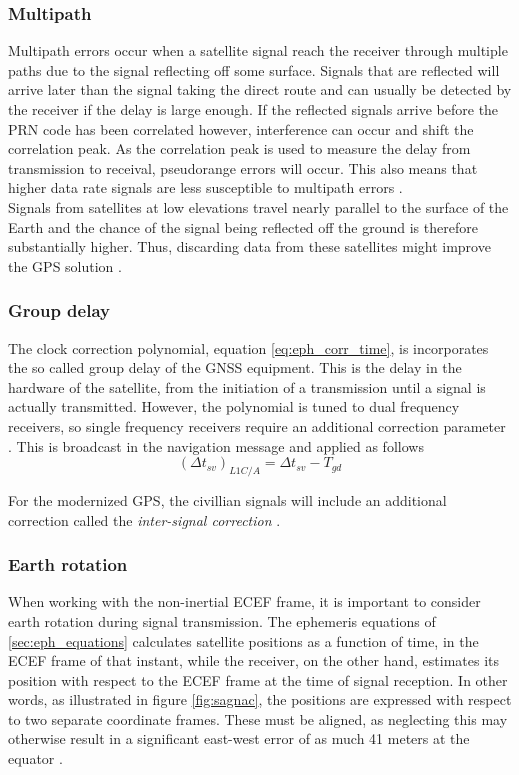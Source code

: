 \subsubsection{Multipath}
\label{sec:multipath}
Multipath errors occur when a satellite signal reach the receiver through multiple paths due to the signal reflecting off some surface. Signals that are reflected will arrive later than the signal taking the direct route and can usually be detected by the receiver if the delay is large enough. If the reflected signals arrive before the PRN code has been correlated however, interference can occur and shift the correlation peak. As the correlation peak is used to measure the delay from transmission to receival, pseudorange errors will occur. This also means that higher data rate signals are less susceptible to multipath errors \cite{groves2013principles}. \\

Signals from satellites at low elevations travel nearly parallel to the surface of the Earth and the chance of the signal being reflected off the ground is therefore substantially higher. Thus, discarding data from these satellites might improve the GPS solution \cite{farrell2008aided, groves2013principles}.

\subsubsection{Group delay}
The clock correction polynomial, equation \ref{eq:eph_corr_time}, is incorporates the so called group delay of the GNSS equipment. This is the delay in the hardware of the satellite, from the initiation of a transmission until a signal is actually transmitted. However, the polynomial is tuned to dual frequency receivers, so single frequency receivers require an additional correction parameter \cite{spec:gps}. This is broadcast in the navigation message and applied as follows
\begin{equation}
    (\Delta t_{sv})_{L1C/A} = \Delta t_{sv} - T_{gd}
\end{equation}

For the modernized GPS, the civillian signals will include an additional correction called the \textit{inter-signal correction} \cite{spec:gps-new}.


\subsubsection{Earth rotation}
When working with the non-inertial ECEF frame, it is important to consider earth rotation during signal transmission. The ephemeris equations of \ref{sec:eph_equations} calculates satellite positions as a function of time, in the ECEF frame of that instant, while the receiver, on the other hand, estimates its position with respect to the ECEF frame at the time of signal reception. In other words, as illustrated in figure \ref{fig:sagnac}, the positions are expressed with respect to two separate coordinate frames. These must be aligned, as neglecting this may otherwise result in a significant east-west error of as much 41 meters at the equator \cite{groves2013principles}.\\

